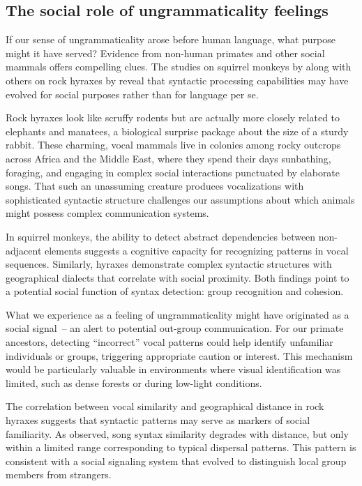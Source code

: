 \subsection{The social role of ungrammaticality feelings}

If our sense of ungrammaticality arose before human language, what purpose might it have served? Evidence from non-human primates and other social mammals offers compelling clues. The studies on squirrel monkeys by \citet{Ravignani2013} along with others on rock hyraxes by \citet{Kershenbaum2012} reveal that syntactic processing capabilities may have evolved for social purposes rather than for language per se.

Rock hyraxes look like scruffy rodents but are actually more closely related to elephants and manatees, a biological surprise package about the size of a sturdy rabbit. These charming, vocal mammals live in colonies among rocky outcrops across Africa and the Middle East, where they spend their days sunbathing, foraging, and engaging in complex social interactions punctuated by elaborate songs. That such an unassuming creature produces vocalizations with sophisticated syntactic structure challenges our assumptions about which animals might possess complex communication systems.

In squirrel monkeys, the ability to detect abstract dependencies between non-adjacent elements suggests a cognitive capacity for recognizing patterns in vocal sequences. Similarly, hyraxes demonstrate complex syntactic structures with geographical dialects that correlate with social proximity. Both findings point to a potential social function of syntax detection: group recognition and cohesion.

What we experience as a feeling of ungrammaticality might have originated as a social signal~-- an alert to potential out-group communication. For our primate ancestors, detecting ``incorrect'' vocal patterns could help identify unfamiliar individuals or groups, triggering appropriate caution or interest. This mechanism would be particularly valuable in environments where visual identification was limited, such as dense forests or during low-light conditions.

The correlation between vocal similarity and geographical distance in rock hyraxes suggests that syntactic patterns may serve as markers of social familiarity. As \citet{Kershenbaum2012} observed, song syntax similarity degrades with distance, but only within a limited range corresponding to typical dispersal patterns. This pattern is consistent with a social signaling system that evolved to distinguish local group members from strangers.

